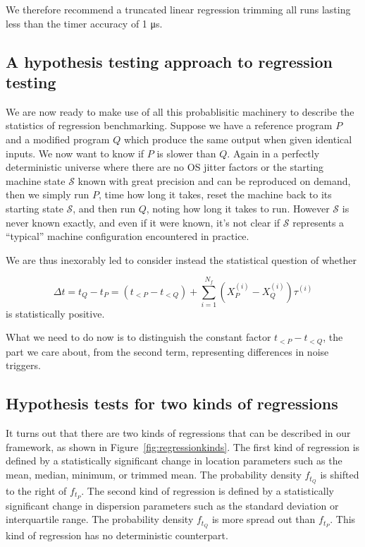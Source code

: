 \documentclass[conference]{IEEEtran}
\begin{document}
We therefore recommend a truncated linear regression trimming all runs lasting less than the timer accuracy of 1 μs.


\subsection{A hypothesis testing approach to regression testing}

We are now ready to make use of all this probablisitic machinery to describe the statistics of regression benchmarking. Suppose we have a reference program $P$ and a modified program $Q$ which produce the same output when given identical inputs. We now want to know if $P$ is slower than $Q$. Again in a perfectly deterministic universe where there are no OS jitter factors or the starting machine state $\mathcal S$ known with great precision and can be reproduced on demand, then we simply run $P$, time how long it takes, reset the machine back to its starting state $\mathcal S$, and then run $Q$, noting how long it takes to run. However $\mathcal S$ is never known exactly, and even if it were known, it's not clear if
$\mathcal S$ represents a ``typical'' machine configuration encountered in practice.

We are thus inexorably led to consider instead the statistical question of whether

\begin{equation}
\Delta t = t_Q - t_P
= (t_{<P} - t_{<Q}) + \sum_{i=1}^{N_f} (X^{(i)}_P - X^{(i)}_Q) \tau^{(i)}
\end{equation}
%
is statistically positive.

What we need to do now is to distinguish the constant factor $t_{<P} - t_{<Q}$, the part we care about, from the second term, representing differences in noise triggers.


\subsection{Hypothesis tests for two kinds of regressions}

It turns out that there are two kinds of regressions that can be described in our framework, as shown in Figure~\ref{fig:regressionkinds}. The first kind of regression is defined by a statistically significant change in location parameters such as the mean, median, minimum, or trimmed mean. The probability density $f_{t_Q}$ is shifted to the right of $f_{t_P}$. The second kind of regression is defined by a statistically significant change in dispersion parameters such as the standard deviation or interquartile range. The probability density $f_{t_Q}$ is more spread out than $f_{t_P}$. This kind of regression has no deterministic counterpart.
\end{document}

